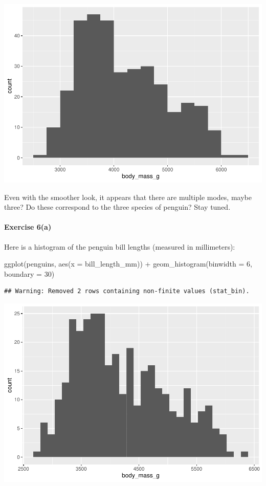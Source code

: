 \documentclass[
]{book}
\newenvironment{Shaded}{\begin{snugshade}}{\end{snugshade}}
\newcommand{\AttributeTok}[1]{\textcolor[rgb]{0.77,0.63,0.00}{#1}}
\newcommand{\DecValTok}[1]{\textcolor[rgb]{0.00,0.00,0.81}{#1}}
\newcommand{\FunctionTok}[1]{\textcolor[rgb]{0.00,0.00,0.00}{#1}}
\newcommand{\NormalTok}[1]{#1}
\newcommand{\SpecialCharTok}[1]{\textcolor[rgb]{0.00,0.00,0.00}{#1}}
\begin{document}
\includegraphics{intro_stats_files/figure-latex/unnamed-chunk-98-1.pdf}

Even with the smoother look, it appears that there are multiple modes, maybe three? Do these correspond to the three species of penguin? Stay tuned.

\hypertarget{exercise-6a-1}{%
\paragraph*{Exercise 6(a)}\label{exercise-6a-1}}

Here is a histogram of the penguin bill lengths (measured in millimeters):

\begin{Shaded}
\begin{Highlighting}[]
\FunctionTok{ggplot}\NormalTok{(penguins, }\FunctionTok{aes}\NormalTok{(}\AttributeTok{x =}\NormalTok{ bill\_length\_mm)) }\SpecialCharTok{+}
    \FunctionTok{geom\_histogram}\NormalTok{(}\AttributeTok{binwidth =} \DecValTok{6}\NormalTok{, }\AttributeTok{boundary =} \DecValTok{30}\NormalTok{)}
\end{Highlighting}
\end{Shaded}

\begin{verbatim}
## Warning: Removed 2 rows containing non-finite values (stat_bin).
\end{verbatim}

\includegraphics{intro_stats_files/figure-latex/unnamed-chunk-99-1.pdf}
\end{document}
